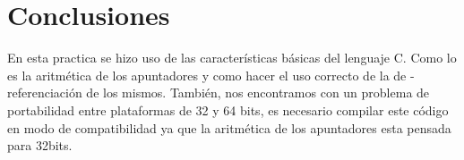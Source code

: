 \documentclass{article}
\begin{document}
\section{Conclusiones}
En esta practica se hizo uso de las caracter\'{i}sticas b\'{a}sicas del lenguaje C. Como lo es la aritm\'{e}tica de los apuntadores y como hacer el uso correcto de la de - referenciaci\'{o}n de los mismos.
Tambi\'{e}n, nos encontramos con un problema de portabilidad entre plataformas de 32 y 64 bits, es necesario compilar este c\'{o}digo en modo de compatibilidad ya que la aritm\'{e}tica de los apuntadores esta pensada para 32bits.

\end{document}
